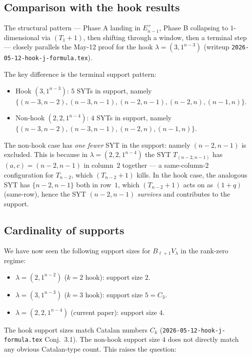\documentclass[11pt]{article}
\theoremstyle{definition}
\begin{document}
\subsection{Comparison with the hook results}

The structural pattern --- Phase A landing in $E_{n-1}^+$, Phase B
collapsing to $1$-dimensional via $(T_1{+}1)$, then shifting through
a window, then a terminal step --- closely parallels the May-12 proof
for the hook $\lambda = (3, 1^{n-3})$ (writeup
\texttt{2026-05-12-hook-j-formula.tex}).

The key difference is the terminal support pattern:
\begin{itemize}[leftmargin=2em,topsep=0.3em,itemsep=0.2em]
\item Hook $(3,1^{n-3})$: $5$ SYTs in support, namely
$\{(n-3,n-2),(n-3,n-1),(n-2,n-1),(n-2,n),(n-1,n)\}$.
\item Non-hook $(2,2,1^{n-4})$: $4$ SYTs in support, namely
$\{(n-3,n-2),(n-3,n-1),(n-2,n),(n-1,n)\}$.
\end{itemize}
The non-hook case has \emph{one fewer} SYT in the support: namely
$(n-2,n-1)$ is excluded.  This is because in $\lambda=(2,2,1^{n-4})$
the SYT $T_{(n-2,n-1)}$ has $(a,c) = (n-2,n-1)$ in column~$2$
together --- a same-column-$2$ configuration for $T_{n-2}$, which
$(T_{n-2}{+}1)$ kills.  In the hook case, the analogous SYT has
$\{n-2,n-1\}$ both in row~$1$, which $(T_{n-2}{+}1)$ acts on as
$(1+q)$ (same-row), hence the SYT $(n-2,n-1)$ \emph{survives} and
contributes to the support.

\subsection{Cardinality of supports}

We have now seen the following support sizes for $B_{\ell+1} V_\lambda$
in the rank-zero regime:
\begin{itemize}[leftmargin=2em,topsep=0.3em,itemsep=0.2em]
\item $\lambda = (2, 1^{n-2})$ ($k = 2$ hook): support size $2$.
\item $\lambda = (3, 1^{n-3})$ ($k = 3$ hook): support size $5 = C_3$.
\item $\lambda = (2, 2, 1^{n-4})$ (current paper): support size $4$.
\end{itemize}
The hook support sizes match Catalan numbers $C_k$
(\texttt{2026-05-12-hook-j-formula.tex} Conj.~3.1).  The non-hook
support size $4$ does not directly match any obvious Catalan-type
count.  This raises the question:
\end{document}
